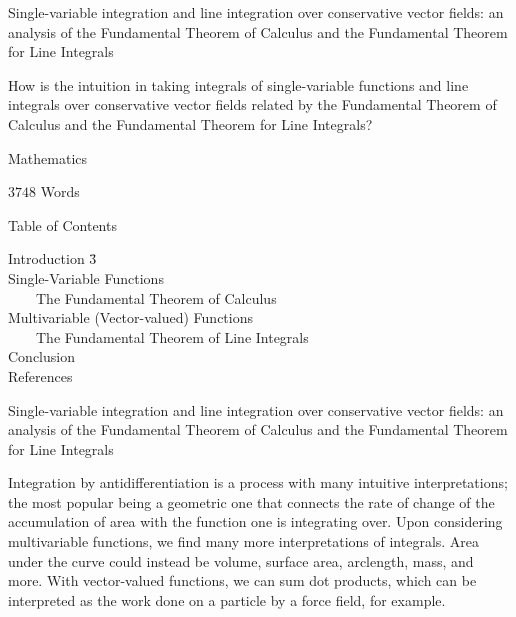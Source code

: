 \documentclass[11pt]{article}
\begin{document}
\thispagestyle{firstpage}
\setcounter{page}{1}
\null
\vspace{2.5cm}
\begin{center}

Single-variable integration and line integration over conservative vector fields: an analysis of the Fundamental Theorem of Calculus and the Fundamental Theorem for Line Integrals

How is the intuition in taking integrals of single-variable functions and line integrals over conservative vector fields related by the Fundamental Theorem of Calculus and the Fundamental Theorem for Line Integrals?

Mathematics

$3748$ Words

\end{center}
\vfill


\pagebreak

{\centering{}Table of Contents

}
\begin{tabbing}
Introduction \hspace{13.98cm} \= 3\\
Single-Variable Functions \\
~~~~The Fundamental Theorem of Calculus \\
Multivariable (Vector-valued) Functions \\
~~~~The Fundamental Theorem of Line Integrals \\
Conclusion \\
References \\
\end{tabbing}
\pagebreak

{\centering{}Single-variable integration and line integration over conservative vector fields: an analysis of the Fundamental Theorem of Calculus and the Fundamental Theorem for Line Integrals

}

Integration by antidifferentiation is a process with many intuitive interpretations; the most popular being a geometric one that connects the rate of change of the accumulation of area with the function one is integrating over. Upon considering multivariable functions, we find many more interpretations of integrals. Area under the curve could instead be volume, surface area, arclength, mass, and more. With vector-valued functions, we can sum dot products, which can be interpreted as the work done on a particle by a force field, for example.
\end{document}
